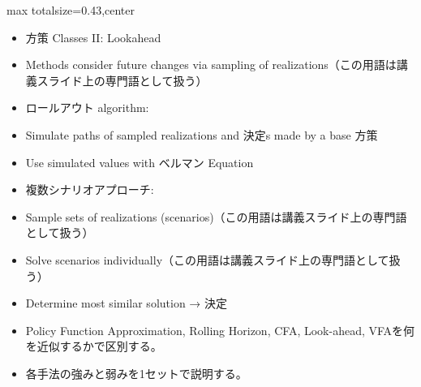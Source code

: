 \clearpage
{}
\begin{minipage}[t]{0.405\textwidth}
\begin{adjustbox}{max totalsize={\textwidth}{0.43\textheight},center}
\begin{minipage}{\textwidth}\scriptsize
{}\begin{itemize}
\item 方策 Classes II: Lookahead
\item Methods consider future changes via sampling of realizations（この用語は講義スライド上の専門語として扱う）
\item ロールアウト algorithm:
\item Simulate paths of sampled realizations and 決定s made by a base 方策
\item Use simulated values with ベルマン Equation
\item 複数シナリオアプローチ:
\item Sample sets of realizations (scenarios)（この用語は講義スライド上の専門語として扱う）
\item Solve scenarios individually（この用語は講義スライド上の専門語として扱う）
\item Determine most similar solution → 決定
\end{itemize}\begin{itemize}
\item Policy Function Approximation, Rolling Horizon, CFA, Look-ahead, VFAを何を近似するかで区別する。
\item 各手法の強みと弱みを1セットで説明する。
\end{itemize}
\end{minipage}
\end{adjustbox}
\end{minipage}\hfill
